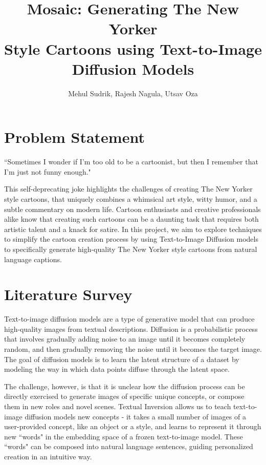 \documentclass[letterpaper]{article} %
\title{Mosaic: Generating The New Yorker\\ Style Cartoons using Text-to-Image Diffusion Models}
\author{
    Mehul Sudrik,
    Rajesh Nagula,
    Utsav Oza
}
\begin{document}
\maketitle

\section{Problem Statement}

\begin{displayquote}
    ``Sometimes I wonder if I'm too old to be a cartoonist, but then I remember that I'm just not funny enough."
\end{displayquote}
This self-deprecating joke highlights the challenges of creating The New Yorker style cartoons, that uniquely combines a whimsical art style, witty humor, and a subtle commentary on modern life. Cartoon enthusiasts and creative professionals alike know that creating such cartoons can be a daunting task that requires both artistic talent and a knack for satire. In this project, we aim to explore techniques to simplify the cartoon creation process by using Text-to-Image Diffusion models to specifically generate high-quality The New Yorker style cartoons from natural language captions.

\section{Literature Survey}
Text-to-image diffusion models are a type of generative model that can produce high-quality images from textual descriptions. Diffusion \cite{c:21} is a probabilistic process that involves gradually adding noise to an image until it becomes completely random, and then gradually removing the noise until it becomes the target image. The goal of diffusion models is to learn the latent structure of a dataset by modeling the way in which data points diffuse through the latent space.

The challenge, however, is that it is unclear how the diffusion process can be directly exercised to generate images of specific unique concepts, or compose them in new roles and novel scenes. Textual Inversion \cite{c:22} allows us to teach text-to-image diffusion models new concepts - it takes a small number of images of a user-provided concept, like an object or a style, and learns to represent it through new ``words" in the embedding space of a frozen text-to-image model. These ``words" can be composed into natural language sentences, guiding personalized creation in an intuitive way.
\end{document}
